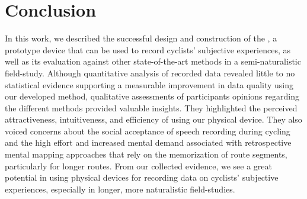 \section{Conclusion}\label{sec:conclusion}

In this work, we described the successful design and construction of the \likertshift, a prototype device that can be used to record cyclists' subjective experiences, as well as its evaluation against other state-of-the-art methods in a semi-naturalistic field-study.
Although quantitative analysis of recorded data revealed little to no statistical evidence supporting a measurable improvement in data quality using our developed \likertshift method, qualitative assessments of participants opinions regarding the different methods provided valuable insights.
They highlighted the perceived attractiveness, intuitiveness, and efficiency of using our physical device.
They also voiced concerns about the social acceptance of speech recording during cycling and the high effort and increased mental demand associated with retrospective mental mapping approaches that rely on the memorization of route segments, particularly for longer routes.
From our collected evidence, we see a great potential in using physical devices for recording data on cyclists' subjective experiences, especially in longer, more naturalistic field-studies.
